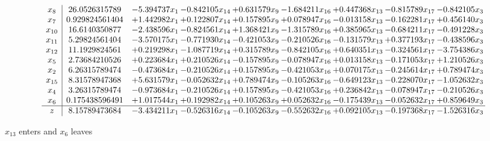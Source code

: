 \documentclass[10pt]{article}
\begin{document}
 \[\begin{array}{c| c c@{\hskip 2pt} c@{\hskip 2pt} c@{\hskip 2pt} c@{\hskip 2pt} c@{\hskip 2pt} c@{\hskip 2pt} c@{\hskip 2pt} }
 x_{8}   &  26.0526315789 & -5.394737 x_{1} & -0.842105 x_{14} & + 0.631579 x_{9} & -1.684211 x_{16} & + 0.447368 x_{13} & -0.815789 x_{17} & -0.842105 x_{3}\\
 x_{7}   &  0.929824561404 & + 1.442982 x_{1} & + 0.122807 x_{14} & + 0.157895 x_{9} & + 0.078947 x_{16} & -0.013158 x_{13} & -0.162281 x_{17} & + 0.456140 x_{3}\\
 x_{10}   &  16.6140350877 & -2.438596 x_{1} & -0.824561 x_{14} & + 1.368421 x_{9} & -1.315789 x_{16} & + 0.385965 x_{13} & -0.684211 x_{17} & -0.491228 x_{3}\\
 x_{11}   &  5.29824561404 & -3.570175 x_{1} & -0.771930 x_{14} & -0.421053 x_{9} & -0.210526 x_{16} & -0.131579 x_{13} & + 0.377193 x_{17} & -0.438596 x_{3}\\
 x_{12}   &  11.1929824561 & + 0.219298 x_{1} & -1.087719 x_{14} & + 0.315789 x_{9} & -0.842105 x_{16} & + 0.640351 x_{13} & -0.324561 x_{17} & -3.754386 x_{3}\\
 x_{5}   &  2.73684210526 & + 0.223684 x_{1} & + 0.210526 x_{14} & -0.157895 x_{9} & -0.078947 x_{16} & + 0.013158 x_{13} & -0.171053 x_{17} & + 1.210526 x_{3}\\
 x_{2}   &  6.26315789474 & -0.473684 x_{1} & -0.210526 x_{14} & + 0.157895 x_{9} & -0.421053 x_{16} & + 0.070175 x_{13} & -0.245614 x_{17} & + 0.789474 x_{3}\\
 x_{15}   &  8.31578947368 & + 5.631579 x_{1} & -0.052632 x_{14} & + 0.789474 x_{9} & -0.105263 x_{16} & -0.649123 x_{13} & -0.228070 x_{17} & -1.052632 x_{3}\\
 x_{4}   &  3.26315789474 & -0.973684 x_{1} & -0.210526 x_{14} & + 0.157895 x_{9} & -0.421053 x_{16} & + 0.236842 x_{13} & -0.078947 x_{17} & -0.210526 x_{3}\\
 x_{6}   &  0.175438596491 & + 1.017544 x_{1} & + 0.192982 x_{14} & + 0.105263 x_{9} & + 0.052632 x_{16} & -0.175439 x_{13} & -0.052632 x_{17} & + 0.859649 x_{3}\\
\hline
z    &  8.15789473684 & -3.434211 x_{1} & -0.526316 x_{14} & -0.105263 x_{9} & -0.552632 x_{16} & + 0.092105 x_{13} & -0.197368 x_{17} & -1.526316 x_{3}\\
\end{array}\]


 $ x_{13} $ enters and $ x_{6} $ leaves 
\end{document}
